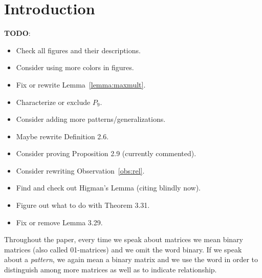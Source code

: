 \chapter*{Introduction}
\textbf{TODO}:
\begin{itemize}
	\item Check all figures and their descriptions.
	\item Consider using more colors in figures.
	\item Fix or rewrite Lemma~\ref{lemma:maxmult}.
	\item Characterize or exclude $P_9$.
	\item Consider adding more patterns/generalizations.
	\item Maybe rewrite Definition 2.6.
	\item Consider proving Proposition 2.9 (currently commented).
	\item Consider rewriting Observation~\ref{obs:rel}.
	\item Find and check out Higman's Lemma (citing blindly now).
	\item Figure out what to do with Theorem 3.31.
	\item Fix or remove Lemma 3.29.
\end{itemize}

Throughout the paper, every time we speak about matrices we mean binary matrices (also called 01-matrices) and we omit the word binary. If we speak about a \emph{pattern}, we again mean a binary matrix and we use the word in order to distinguish among more matrices as well as to indicate relationship.

